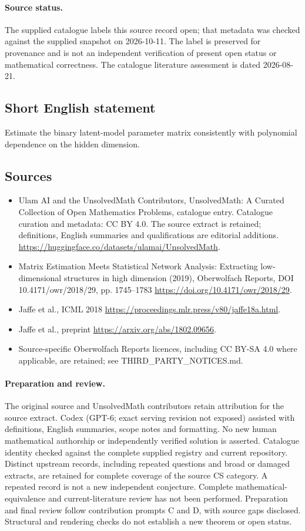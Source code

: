 \documentclass[11pt]{article}
\begin{document}
\paragraph{Source status.}
The supplied catalogue labels this source record open; that metadata was checked against the supplied snapshot on 2026-10-11. The label is preserved for provenance and is not an independent verification of present open status or mathematical correctness. The catalogue literature assessment is dated 2026-08-21.
\subsection{Short English statement}
Estimate the binary latent-model parameter matrix consistently with polynomial dependence on the hidden dimension.
\subsection{Sources}
\begin{itemize}
\item[S1] Ulam AI and the UnsolvedMath Contributors, UnsolvedMath: A Curated Collection of Open Mathematics Problems, catalogue entry. Catalogue curation and metadata: CC BY 4.0. The source extract is retained; definitions, English summaries and qualifications are editorial additions.
\url{https://huggingface.co/datasets/ulamai/UnsolvedMath}.
\item[S2] Matrix Estimation Meets Statistical Network Analysis: Extracting low-dimensional structures in high dimension (2019), Oberwolfach Reports, DOI 10.4171/owr/2018/29, pp. 1745--1783
\url{https://doi.org/10.4171/owr/2018/29}.
\item[S3] Jaffe et al., ICML 2018
\url{https://proceedings.mlr.press/v80/jaffe18a.html}.
\item[S4] Jaffe et al., preprint
\url{https://arxiv.org/abs/1802.09656}.
\item Source-specific Oberwolfach Reports licences, including CC BY-SA 4.0 where applicable, are retained; see THIRD\_PARTY\_NOTICES.md.
\end{itemize}
\paragraph{Preparation and review.}
The original source and UnsolvedMath contributors retain attribution for the source extract. Codex (GPT-6; exact serving revision not exposed) assisted with definitions, English summaries, scope notes and formatting. No new human mathematical authorship or independently verified solution is asserted. Catalogue identity checked against the complete supplied registry and current repository. Distinct upstream records, including repeated questions and broad or damaged extracts, are retained for complete coverage of the source CS category. A repeated record is not a new independent conjecture. Complete mathematical-equivalence and current-literature review has not been performed. Preparation and final review follow contribution prompts C and D, with source gaps disclosed. Structural and rendering checks do not establish a new theorem or open status.
\label{end:statement}
\end{document}
